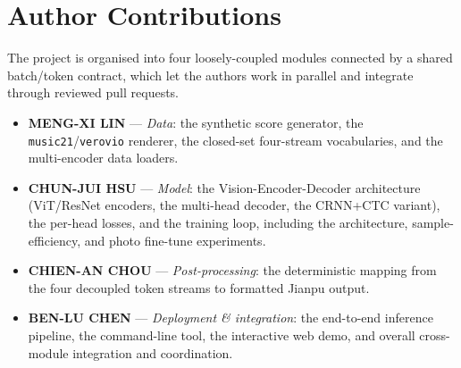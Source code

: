 \section*{Author Contributions}

The project is organised into four loosely-coupled modules connected by a shared
batch/token contract, which let the authors work in parallel and integrate
through reviewed pull requests.
\begin{itemize}
    \item \textbf{MENG-XI LIN} --- \emph{Data}: the synthetic score generator, the
    \texttt{music21}/\texttt{verovio} renderer, the closed-set four-stream
    vocabularies, and the multi-encoder data loaders.
    \item \textbf{CHUN-JUI HSU} --- \emph{Model}: the Vision-Encoder-Decoder
    architecture (ViT/ResNet encoders, the multi-head decoder, the CRNN+CTC
    variant), the per-head losses, and the training loop, including the
    architecture, sample-efficiency, and photo fine-tune experiments.
    \item \textbf{CHIEN-AN CHOU} --- \emph{Post-processing}: the deterministic
    mapping from the four decoupled token streams to formatted Jianpu output.
    \item \textbf{BEN-LU CHEN} --- \emph{Deployment \& integration}: the
    end-to-end inference pipeline, the command-line tool, the interactive web
    demo, and overall cross-module integration and coordination.
\end{itemize}
